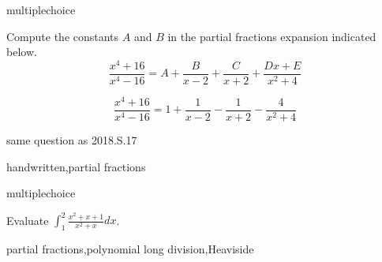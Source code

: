 \documentclass{ximera}
\begin{document}
\begin{question}[2016C.04]
\begin{type}
multiplechoice
\end{type}
Compute the constants \(A\) and \(B\) in the partial fractions expansion indicated below. 
\[ \frac{x^4 + 16}{x^4 - 16} =A +  \frac{B}{x-2} + \frac{C}{x+2} + \frac{Dx + E}{x^2 + 4} \]
\begin{multiplechoice}
 \choicebreak
{}
\end{multiplechoice}
\begin{comments}
\[  \frac{x^4 + 16}{x^4 - 16} = 1 + \frac{1}{x-2} - \frac{1}{x+2} - \frac{4}{x^2+4} \]
\end{comments}
\begin{notes}
same question as 2018.S.17
\end{notes}
\begin{keywords}
handwritten,partial fractions
\end{keywords}
\end{question}

\begin{question}[2017C.04]
\begin{type}
multiplechoice
\end{type}
Evaluate \(\displaystyle \int_1^2 \frac{x^2+x+1}{x^2+x} dx\).
\begin{multiplechoice}
\end{multiplechoice}
\begin{keywords}
partial fractions,polynomial long division,Heaviside
\end{keywords}
\end{question}
\end{document}
